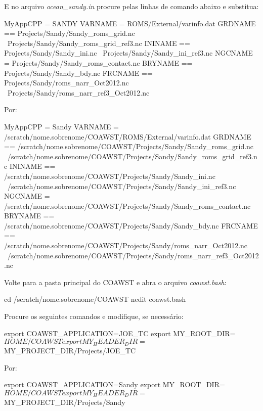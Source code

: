 \noindent E no arquivo \textit{ocean\_sandy.in} procure pelas linhas de comando abaixo e substitua:
\bigskip

\begin{bashcode}
MyAppCPP = SANDY
VARNAME  = ROMS/External/varinfo.dat
GRDNAME == Projects/Sandy/Sandy_roms_grid.nc \
           Projects/Sandy/Sandy_roms_grid_ref3.nc
ININAME == Projects/Sandy/Sandy_ini.nc \
           Projects/Sandy/Sandy_ini_ref3.nc
NGCNAME =  Projects/Sandy/Sandy_roms_contact.nc
BRYNAME == Projects/Sandy/Sandy_bdy.nc
FRCNAME == Projects/Sandy/roms_narr_Oct2012.nc \
           Projects/Sandy/roms_narr_ref3_Oct2012.nc
\end{bashcode}
\bigskip

\noindent Por:
\bigskip

\begin{bashcode}[fontsize=\footnotesize]
MyAppCPP = Sandy
VARNAME  = /scratch/nome.sobrenome/COAWST/ROMS/External/varinfo.dat
GRDNAME == /scratch/nome.sobrenome/COAWST/Projects/Sandy/Sandy_roms_grid.nc \
           /scratch/nome.sobrenome/COAWST/Projects/Sandy/Sandy_roms_grid_ref3.nc
ININAME == /scratch/nome.sobrenome/COAWST/Projects/Sandy/Sandy_ini.nc \
           /scratch/nome.sobrenome/COAWST/Projects/Sandy/Sandy_ini_ref3.nc
NGCNAME =  /scratch/nome.sobrenome/COAWST/Projects/Sandy/Sandy_roms_contact.nc
BRYNAME == /scratch/nome.sobrenome/COAWST/Projects/Sandy/Sandy_bdy.nc
FRCNAME == /scratch/nome.sobrenome/COAWST/Projects/Sandy/roms_narr_Oct2012.nc \
           /scratch/nome.sobrenome/COAWST/Projects/Sandy/roms_narr_ref3_Oct2012.nc
\end{bashcode}
\bigskip

\noindent Volte para a pasta principal do COAWST e abra o arquivo \textit{coawst.bash}:
\bigskip

\begin{bashcode}
cd /scratch/nome.sobrenome/COAWST
nedit coawst.bash
\end{bashcode}
\bigskip

\noindent Procure os seguintes comandos e modifique, se necessário:
\bigskip

\begin{bashcode}
export   COAWST_APPLICATION=JOE_TC
export   MY_ROOT_DIR=${HOME}/COAWST
export   MY_HEADER_DIR=${MY_PROJECT_DIR}/Projects/JOE_TC
\end{bashcode}
\bigskip

\noindent Por:
\bigskip

\begin{bashcode}
export   COAWST_APPLICATION=Sandy
export   MY_ROOT_DIR=${HOME}/COAWST
export   MY_HEADER_DIR=${MY_PROJECT_DIR}/Projects/Sandy
\end{bashcode}
\bigskip

